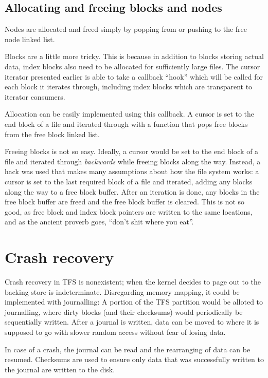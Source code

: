 \documentclass{report}
\begin{document}
\subsection*{Allocating and freeing blocks and nodes}

Nodes are allocated and freed simply by popping from or pushing to the free node linked list.

Blocks are a little more tricky.
This is because in addition to blocks storing actual data,
index blocks also need to be allocated for sufficiently large files.
The cursor iterator presented earlier is able to take a callback ``hook''
which will be called for each block it iterates through,
including index blocks which are transparent to iterator consumers.

Allocation can be easily implemented using this callback.
A cursor is set to the end block of a file and iterated through
with a function that pops free blocks from the free block linked list.

Freeing blocks is not so easy.
Ideally, a cursor would be set to the end block of a file and iterated through \emph{backwards}
while freeing blocks along the way.
Instead, a hack was used that makes many assumptions about how the file system works:
a cursor is set to the last required block of a file and iterated,
adding any blocks along the way to a free block buffer.
After an iteration is done, any blocks in the free block buffer are freed
and the free block buffer is cleared.
This is not so good, as free block and index block pointers are written to the same locations,
and as the ancient proverb goes, ``don't shit where you eat''.

\section*{Crash recovery}

Crash recovery in TFS is nonexistent;
when the kernel decides to page out to the backing store is indeterminate.
Disregarding memory mapping, it could be implemented with journalling:
A portion of the TFS partition would be alloted to journalling,
where dirty blocks (and their checksums) would periodically be sequentially written.
After a journal is written, data can be moved to where it is supposed to go
with slower random access without fear of losing data.

In case of a crash, the journal can be read and the rearranging of data can be resumed.
Checksums are used to ensure only data that was successfully written to the journal
are written to the disk.
\end{document}
